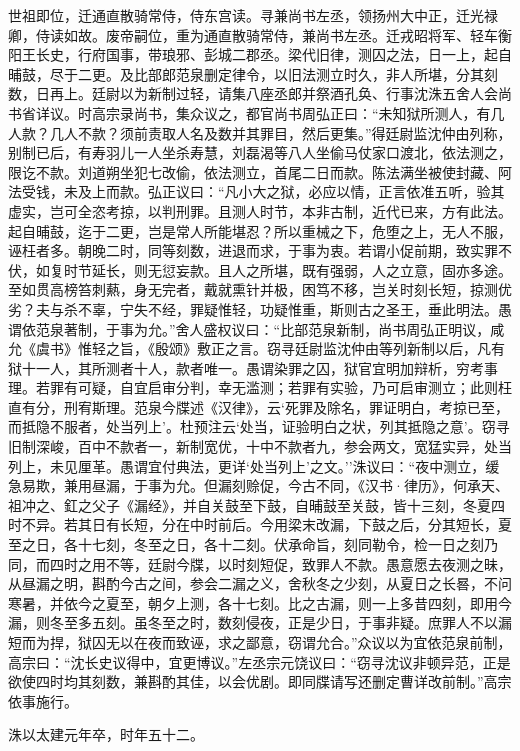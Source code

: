 \documentclass[]{article}
\begin{document}
世祖即位，迁通直散骑常侍，侍东宫读。寻兼尚书左丞，领扬州大中正，迁光禄卿，侍读如故。废帝嗣位，重为通直散骑常侍，兼尚书左丞。迁戎昭将军、轻车衡阳王长史，行府国事，带琅邪、彭城二郡丞。梁代旧律，测囚之法，日一上，起自晡鼓，尽于二更。及比部郎范泉删定律令，以旧法测立时久，非人所堪，分其刻数，日再上。廷尉以为新制过轻，请集八座丞郎并祭酒孔奂、行事沈洙五舍人会尚书省详议。时高宗录尚书，集众议之，都官尚书周弘正曰：``未知狱所测人，有几人款？几人不款？须前责取人名及数并其罪目，然后更集。''得廷尉监沈仲由列称，别制已后，有寿羽儿一人坐杀寿慧，刘磊渴等八人坐偷马仗家口渡北，依法测之，限讫不款。刘道朔坐犯七改偷，依法测立，首尾二日而款。陈法满坐被使封藏、阿法受钱，未及上而款。弘正议曰：``凡小大之狱，必应以情，正言依准五听，验其虚实，岂可全恣考掠，以判刑罪。且测人时节，本非古制，近代已来，方有此法。起自晡鼓，迄于二更，岂是常人所能堪忍？所以重械之下，危堕之上，无人不服，诬枉者多。朝晚二时，同等刻数，进退而求，于事为衷。若谓小促前期，致实罪不伏，如复时节延长，则无愆妄款。且人之所堪，既有强弱，人之立意，固亦多途。至如贯高榜笞刺爇，身无完者，戴就熏针并极，困笃不移，岂关时刻长短，掠测优劣？夫与杀不辜，宁失不经，罪疑惟轻，功疑惟重，斯则古之圣王，垂此明法。愚谓依范泉著制，于事为允。''舍人盛权议曰：``比部范泉新制，尚书周弘正明议，咸允《虞书》惟轻之旨，《殷颂》敷正之言。窃寻廷尉监沈仲由等列新制以后，凡有狱十一人，其所测者十人，款者唯一。愚谓染罪之囚，狱官宜明加辩析，穷考事理。若罪有可疑，自宜启审分判，幸无滥测；若罪有实验，乃可启审测立；此则枉直有分，刑宥斯理。范泉今牒述《汉律》，云`死罪及除名，罪证明白，考掠已至，而抵隐不服者，处当列上'。杜预注云`处当，证验明白之状，列其抵隐之意'。窃寻旧制深峻，百中不款者一，新制宽优，十中不款者九，参会两文，宽猛实异，处当列上，未见厘革。愚谓宜付典法，更详`处当列上'之文。''洙议曰：``夜中测立，缓急易欺，兼用昼漏，于事为允。但漏刻赊促，今古不同，《汉书·律历》，何承天、祖冲之、釭之父子《漏经》，并自关鼓至下鼓，自晡鼓至关鼓，皆十三刻，冬夏四时不异。若其日有长短，分在中时前后。今用梁末改漏，下鼓之后，分其短长，夏至之日，各十七刻，冬至之日，各十二刻。伏承命旨，刻同勒令，检一日之刻乃同，而四时之用不等，廷尉今牒，以时刻短促，致罪人不款。愚意愿去夜测之昧，从昼漏之明，斟酌今古之间，参会二漏之义，舍秋冬之少刻，从夏日之长晷，不问寒暑，并依今之夏至，朝夕上测，各十七刻。比之古漏，则一上多昔四刻，即用今漏，则冬至多五刻。虽冬至之时，数刻侵夜，正是少日，于事非疑。庶罪人不以漏短而为捍，狱囚无以在夜而致诬，求之鄙意，窃谓允合。''众议以为宜依范泉前制，高宗曰：``沈长史议得中，宜更博议。''左丞宗元饶议曰：``窃寻沈议非顿异范，正是欲使四时均其刻数，兼斟酌其佳，以会优剧。即同牒请写还删定曹详改前制。''高宗依事施行。

洙以太建元年卒，时年五十二。
\end{document}
